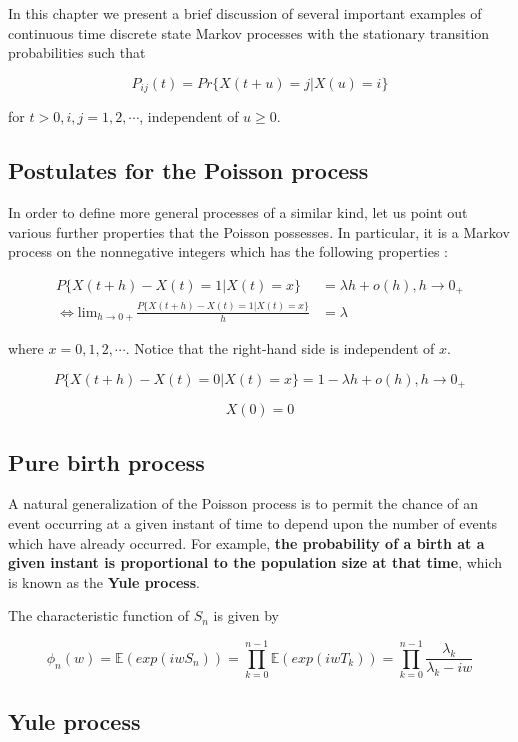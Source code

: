 \documentclass[12pt]{article}
\theoremstyle{nonumberbreak}
\begin{document}
In this chapter we present a brief discussion of several important examples of continuous time discrete state Markov processes with the stationary transition probabilities such that 

$$
P_{ij}(t) = Pr\{ X(t+u) = j | X(u) = i \}
$$

for $t>0, i,j=1,2,\cdots$, independent of $u \ge 0$. 

\subsection{Postulates for the Poisson process}

In order to define more general processes of a similar kind, let us point out various further properties that the Poisson possesses. In particular, it is a Markov process on the nonnegative integers which has the following properties :


$$
\begin{aligned}
P\{ X(t+h) - X(t) = 1 | X(t) = x \} &= \lambda h + o(h), h \to 0_+ \\[10pt]
\Leftrightarrow \mathrm{lim}_{h \to 0+} \frac{P\{ X(t+h) - X(t) = 1 | X(t) = x \}}{h} &= \lambda
\end{aligned}
$$

where $x=0,1,2,\cdots$. Notice that the right-hand side is independent of $x$. 


$$
P\{ X(t+h) - X(t) = 0 | X(t) = x \} = 1 - \lambda h + o(h), h \to 0_+
$$

$$
X(0) = 0 
$$


\subsection{Pure birth process}

A natural generalization of the Poisson process is to permit the chance of an event occurring at a given instant of time to depend upon the number of events which have already occurred. For example, \textbf{the probability of a birth at a given instant is proportional to the population size at that time}, which is known as the \textbf{Yule process}.


The characteristic function of $S_n$ is given by

$$
\phi_n(w) = \mathbb{E}(exp(iwS_n)) = \prod_{k=0}^{n-1} \mathbb{E}(exp(iw T_k)) = \prod_{k=0}^{n-1} \frac{\lambda_k}{\lambda_k - iw}
$$


\subsection{Yule process}
\end{document}
